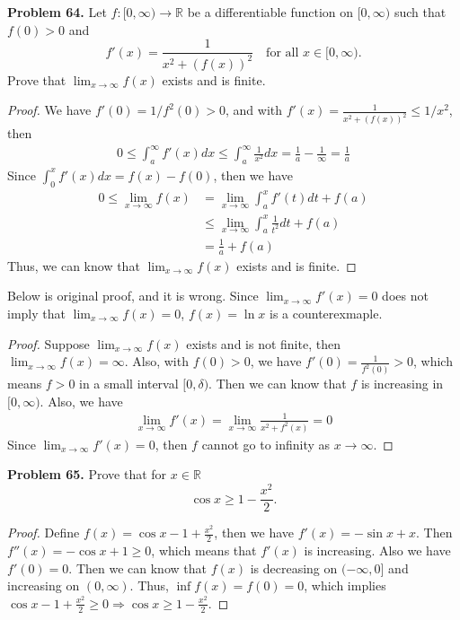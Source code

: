 \documentclass[12pt,leqno]{amsart}
\theoremstyle{definition}
\begin{document}
\medskip


\noindent
{\bf Problem 64.}
Let $f:[0,\infty)\to\mathbb{R}$ be a differentiable function on $[0,\infty)$ such that $f(0)>0$ and
$$
f'(x)=\frac{1}{x^2+(f(x))^2}
\quad
\text{for all $x\in [0,\infty)$.}
$$
Prove that $\lim_{x\to\infty} f(x)$ exists and is finite.
\begin{proof}
We have $f'(0) = 1/f^2(0) > 0$, and with $f'(x) = \frac{1}{x^2+(f(x))^2} \leq 1/x^2$, then 
\begin{align*}
    0 \leq \int^\infty_a f'(x) dx \leq \int^\infty_a \frac{1}{x^2} dx = \frac{1}{a} - \frac{1}{\infty}  = \frac{1}{a}
\end{align*}
Since $\int^x_0 f'(x)dx = f(x) - f(0)$, then we have 
\begin{align*}
    0 \leq \lim_{x\to\infty}f(x) & = \lim_{x\to\infty}\int^x_{a} f'(t) dt + f(a) \\
    & \leq \lim_{x\to\infty}\int^x_{a} \frac{1}{t^2} dt + f(a) \\
    & = \frac{1}{a} + f(a)
\end{align*}
Thus, we can know that $\lim_{x\to\infty} f(x)$ exists and is finite.
\end{proof}

\hspace*{1em} Below is original proof, and it is wrong. Since $\lim_{x\to\infty}f'(x) = 0$ does not imply that $\lim_{x\to\infty}f(x) = 0$, $f(x) = \ln x$ is a counterexmaple.
\begin{proof}
Suppose $\lim_{x\to\infty}f(x)$ exists and is not finite, then $\lim_{x\to\infty}f(x)=\infty$. Also, with $f(0)>0$, we have $f'(0)=\frac{1}{f^2(0)}>0$, which means $f>0$ in a small interval $[0,\delta)$. Then we can know that $f$ is increasing in $[0,\infty)$. Also, we have 
\begin{align*}
    \lim_{x\to\infty}f'(x)=\lim_{x\to\infty}\frac{1}{x^2+f^2(x)}=0
\end{align*}
Since $\lim_{x\to\infty}f'(x)=0$, then $f$ cannot go to infinity as $x\rightarrow \infty$.
\end{proof}

\medskip


\noindent
{\bf Problem 65.}
Prove that for $x\in\mathbb{R}$
$$
\cos x\geq 1-\frac{x^2}{2}.
$$
\begin{proof}
Define $f(x)=\cos x-1+\frac{x^2}{2}$, then we have $f'(x)=-\sin x+x$. Then $f''(x)=-\cos x +1\geq 0$, which means that $f'(x)$ is increasing. Also we have $f'(0)=0$. Then we can know that $f(x)$ is decreasing on $(-\infty,0]$ and increasing on $(0,\infty)$. Thus, $\inf f(x)=f(0)=0$, which implies $\cos x-1+\frac{x^2}{2}\geq 0 \Rightarrow \cos x\geq 1-\frac{x^2}{2}$.
\end{proof}
\end{document}

